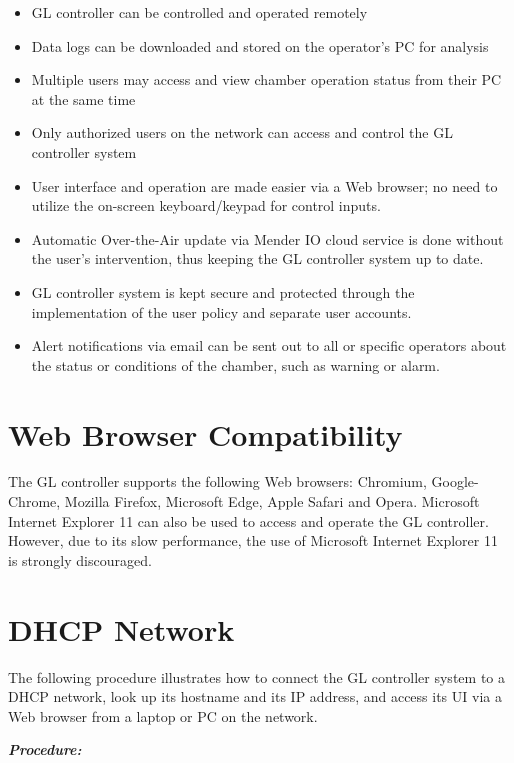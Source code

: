 \begin{itemize}
\item
  GL controller can be controlled and operated remotely
\item
  Data logs can be downloaded and stored on the operator's PC for
  analysis
\item
  Multiple users may access and view chamber operation status from their
  PC at the same time
\item
  Only authorized users on the network can access and control the GL
  controller system
\item
  User interface and operation are made easier via a Web browser; no
  need to utilize the on-screen keyboard/keypad for control inputs.
\item
  Automatic Over-the-Air update via Mender IO cloud service is done
  without the user's intervention, thus keeping the GL controller system
  up to date.
\item
  GL controller system is kept secure and protected through the
  implementation of the user policy and separate user accounts.
\item
  Alert notifications via email can be sent out to all or specific
  operators about the status or conditions of the chamber, such as
  warning or alarm.
\end{itemize}


\section{Web Browser
Compatibility}

The GL controller supports the following Web browsers: Chromium,
Google-Chrome, Mozilla Firefox, Microsoft Edge, Apple Safari and Opera.
Microsoft Internet Explorer 11 can also be used to access and operate
the GL controller. However, due to its slow performance, the use of
Microsoft Internet Explorer 11 is strongly discouraged.


\section{DHCP Network}

The following procedure illustrates how to connect the GL controller
system to a DHCP network, look up its hostname and its IP address, and
access its UI via a Web browser from a laptop or PC on the network.

\textbf{\emph{Procedure:}}

